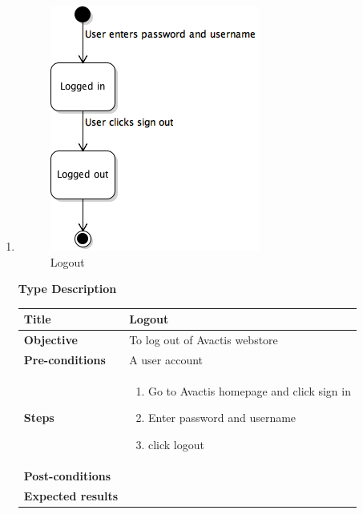 \documentclass[UKenglish,12pt]{article}
\begin{document}
\begin{enumerate}
\item
\begin{figure}[!h]
\centering
\includegraphics[scale=0.8,keepaspectratio]{Images/Logout.png}
\caption{Logout}
\end{figure}
\newpage
\textbf{\hspace{0.3cm}Type\hspace{4.4cm} Description}
\newline \vspace{0.2cm}
\begin{tabular}{| p{5cm} | p{10cm} | }
	\hline
	 \textbf{Title} & Logout \\ \hline
	 \textbf{Objective} & To log out of Avactis webstore \\ \hline
	 \textbf{Pre-conditions} & A user account \\ \hline
	 \textbf{Steps} & \begin{enumerate} \item Go to Avactis homepage and click sign in \item Enter password and username \item click logout  \end{enumerate}\\ \hline
	 \textbf{Post-conditions} & \\ \hline
	 \textbf{Expected results} & \\ 
	 \hline
\end{tabular} %





\end{enumerate}
\end{document}
